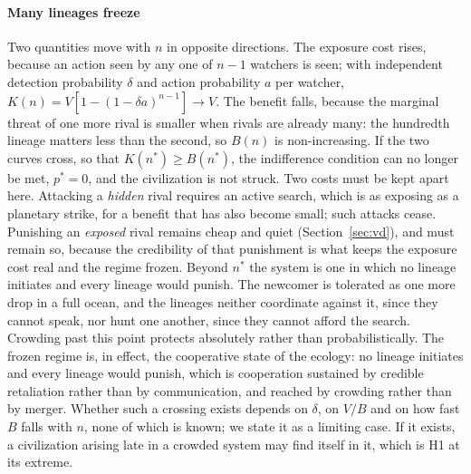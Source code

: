 \documentclass[preprint,12pt]{elsarticle}
\theoremstyle{definition}
\begin{document}
\paragraph{Many lineages freeze}
Two quantities move with $n$ in opposite directions. The exposure cost rises, because an action seen by any one of $n-1$ watchers is seen; with independent detection probability $\delta$ and action probability $a$ per watcher, $K(n) = V[1-(1-\delta a)^{n-1}] \to V$. The benefit falls, because the marginal threat of one more rival is smaller when rivals are already many: the hundredth lineage matters less than the second, so $B(n)$ is non-increasing. If the two curves cross, so that $K(n^{*}) \geq B(n^{*})$, the indifference condition can no longer be met, $p^{*} = 0$, and the civilization is not struck. Two costs must be kept apart here. Attacking a \emph{hidden} rival requires an active search, which is as exposing as a planetary strike, for a benefit that has also become small; such attacks cease. Punishing an \emph{exposed} rival remains cheap and quiet (Section~\ref{sec:vd}), and must remain so, because the credibility of that punishment is what keeps the exposure cost real and the regime frozen. Beyond $n^{*}$ the system is one in which no lineage initiates and every lineage would punish. The newcomer is tolerated as one more drop in a full ocean, and the lineages neither coordinate against it, since they cannot speak, nor hunt one another, since they cannot afford the search. Crowding past this point protects absolutely rather than probabilistically. The frozen regime is, in effect, the cooperative state of the ecology: no lineage initiates and every lineage would punish, which is cooperation sustained by credible retaliation rather than by communication, and reached by crowding rather than by merger. Whether such a crossing exists depends on $\delta$, on $V/B$ and on how fast $B$ falls with $n$, none of which is known; we state it as a limiting case. If it exists, a civilization arising late in a crowded system may find itself in it, which is H1 at its extreme.
\end{document}
